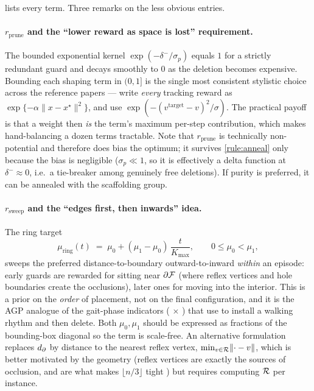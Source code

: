 \documentclass[11pt,a4paper]{article}
\begin{document}
 lists every term. Three remarks on the less obvious entries.

\paragraph{$r_{\mathrm{prune}}$ and the ``lower reward as space is lost'' requirement.}
The bounded exponential kernel $\exp(-\delta^{-}/\sigma_p)$ equals $1$ for a strictly
redundant guard and decays smoothly to $0$ as the deletion becomes expensive. Bounding
each shaping term in $(0,1]$ is the single most consistent stylistic choice across the
reference papers --- \citet{wang2025dribble} write \emph{every} tracking reward as
$\exp\{-\alpha\lVert x - x^\star\rVert^2\}$, and \citet{xu2025striker} use
$\exp(-(v^{\mathrm{target}}-v)^2/\sigma)$. The practical payoff is that a weight then \emph{is}
the term's maximum per-step contribution, which makes hand-balancing a dozen terms
tractable. Note that $r_{\mathrm{prune}}$ is technically non-potential and therefore does bias
the optimum; it survives \cref{rule:anneal} only because the bias is negligible
($\sigma_p \ll 1$, so it is effectively a delta function at $\delta^- \approx 0$, i.e.\ a
tie-breaker among genuinely free deletions). If purity is preferred, it can be annealed
with the scaffolding group.

\paragraph{$r_{\mathrm{sweep}}$ and the ``edges first, then inwards'' idea.}
The ring target
\begin{equation}\label{eq:ring}
  \mu_{\mathrm{ring}}(t) \;=\; \mu_0 + (\mu_1 - \mu_0)\,\frac{t}{K_{\max}},
  \qquad 0 \le \mu_0 < \mu_1 ,
\end{equation}
sweeps the preferred distance-to-boundary outward-to-inward \emph{within} an episode: early
guards are rewarded for sitting near $\partial\mathcal{F}$ (where reflex vertices and hole
boundaries create the occlusions), later ones for moving into the interior. This is a prior
on the \emph{order} of placement, not on the final configuration, and it is the AGP analogue
of the gait-phase indicators ( $\times$ ) that
\citet{xu2025striker} use to install a walking rhythm and then delete. Both $\mu_0,\mu_1$
should be expressed as fractions of the bounding-box diagonal so the term is scale-free.
An alternative formulation replaces $d_{\partial}$ by distance to the nearest reflex vertex,
$\min_{v \in \mathcal{R}}\lVert \cdot - v\rVert$, which is better motivated by the geometry
(reflex vertices are exactly the sources of occlusion, and are what makes $\lfloor n/3\rfloor$
tight \cite{chvatal1975,orourke1987}) but requires computing $\mathcal{R}$ per instance.
\end{document}
